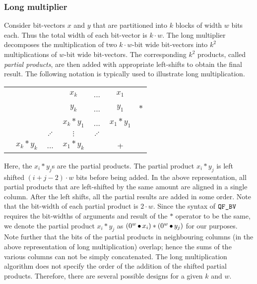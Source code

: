 \subsubsection{Long multiplier}\label{sec:long-mult}

Consider bit-vectors $x$ and $y$ that are partitioned into $k$ blocks of width $w$ bits each. Thus the total width of each bit-vector is $k \cdot w$. 
The long multiplier decomposes the multiplication of two $k \cdot w$-bit wide bit-vectors into $k^2$ multiplications of $w$-bit wide bit-vectors. The corresponding $k^2$ products, called {\em partial products}, are then added with appropriate left-shifts to obtain the final
result. 
%
%
The following notation is typically used to illustrate
long multiplication.
%
\begin{center}
\begin{tabular}{c@{\quad}c@{\quad}c@{\quad}c@{\quad}c@{\quad}c@{\quad}c}
  &&& $x_{k}$ & ... & $x_1$&\\ 
  &&& $y_{k}$ & ... & $y_1$&$*$\\ \hline
  &&&$x_k*y_1$& ... & $x_1*y_1$&\\
  &&$\iddots$&$\vdots$& $\iddots$ && \\
  &$x_k*y_k$& ... &$x_1*y_k$&  & +&\\\hline
\end{tabular}  
\end{center}
Here, the $x_i*y_j$s are the partial products. The partial product $x_i*y_j$ is left shifted $(i+j-2) \cdot w$ bits before being added. In the above representation, all partial
products that are left-shifted by the same amount are aligned in a single column.
After the left shifts, all the partial results are added in some order. 
%
%
%
Note that the bit-width of each partial product is $2 \cdot w$.
%
Since the syntax of $\texttt{QF\_BV}$ requires the bit-widths of arguments and result of the $*$ operator to be the same, we
denote the partial product $x_i * y_j$ as 
$(0^w \mathop{\bullet} x_i)*(0^w \mathop{\bullet} y_j)$ for our purposes. Note
further that the bits of the partial products in neighbouring columns (in the
above representation of long multiplication) overlap; hence the sums of the
various columns can not be simply concatenated. The long multiplication algorithm does not specify the order of the addition of the shifted partial products. Therefore, there are several possible designs for a given $k$ and $w$.

